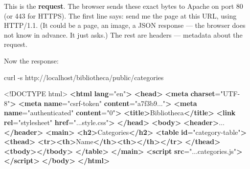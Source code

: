 \documentclass[11pt,a4paper,oneside]{book}
\newenvironment{Shaded}{\begin{snugshade}}{\end{snugshade}}
\newcommand{\KeywordTok}[1]{\textcolor[HTML]{007020}{\textbf{#1}}}
\newcommand{\DataTypeTok}[1]{\textcolor[HTML]{902000}{#1}}
\newcommand{\StringTok}[1]{\textcolor[HTML]{4070A0}{#1}}
\newcommand{\OtherTok}[1]{\textcolor[HTML]{007020}{#1}}
\newcommand{\ExtensionTok}[1]{#1}
\newcommand{\AttributeTok}[1]{\textcolor[HTML]{7D9029}{#1}}
\newcommand{\ErrorTok}[1]{\textcolor[HTML]{FF0000}{\textbf{#1}}}
\newcommand{\NormalTok}[1]{#1}
\begin{document}
This is the \textbf{request}. The browser sends these exact bytes
to Apache on port 80 (or 443 for HTTPS). The first line says:
send me the page at this URL, using HTTP/1.1. (It could be a
page, an image, a JSON response --- the browser does not know in
advance. It just asks.) The rest are headers --- metadata about
the request.

Now the response:

\begin{Shaded}
\begin{Highlighting}[]
\ExtensionTok{curl} \AttributeTok{{-}s}\NormalTok{ http://localhost/bibliotheca/public/categories}
\end{Highlighting}
\end{Shaded}

\begin{Shaded}
\begin{Highlighting}[]
\DataTypeTok{\textless{}!DOCTYPE }\NormalTok{html}\DataTypeTok{\textgreater{}}
\KeywordTok{\textless{}html} \ErrorTok{lang}\OtherTok{=}\StringTok{"en"}\KeywordTok{\textgreater{}}
\KeywordTok{\textless{}head\textgreater{}}
    \KeywordTok{\textless{}meta} \ErrorTok{charset}\OtherTok{=}\StringTok{"UTF{-}8"}\KeywordTok{\textgreater{}}
    \KeywordTok{\textless{}meta} \ErrorTok{name}\OtherTok{=}\StringTok{"csrf{-}token"} \ErrorTok{content}\OtherTok{=}\StringTok{"a7f3b9..."}\KeywordTok{\textgreater{}}
    \KeywordTok{\textless{}meta} \ErrorTok{name}\OtherTok{=}\StringTok{"authenticated"} \ErrorTok{content}\OtherTok{=}\StringTok{"0"}\KeywordTok{\textgreater{}}
    \KeywordTok{\textless{}title\textgreater{}}\NormalTok{Bibliotheca}\KeywordTok{\textless{}/title\textgreater{}}
    \KeywordTok{\textless{}link} \ErrorTok{rel}\OtherTok{=}\StringTok{"stylesheet"} \ErrorTok{href}\OtherTok{=}\StringTok{"...style.css"}\KeywordTok{\textgreater{}}
\KeywordTok{\textless{}/head\textgreater{}}
\KeywordTok{\textless{}body\textgreater{}}
    \KeywordTok{\textless{}header\textgreater{}}\NormalTok{...}\KeywordTok{\textless{}/header\textgreater{}}
    \KeywordTok{\textless{}main\textgreater{}}
        \KeywordTok{\textless{}h2\textgreater{}}\NormalTok{Categories}\KeywordTok{\textless{}/h2\textgreater{}}
        \KeywordTok{\textless{}table} \ErrorTok{id}\OtherTok{=}\StringTok{"category{-}table"}\KeywordTok{\textgreater{}}
            \KeywordTok{\textless{}thead\textgreater{}}
                \KeywordTok{\textless{}tr\textgreater{}\textless{}th\textgreater{}}\NormalTok{Name}\KeywordTok{\textless{}/th\textgreater{}\textless{}th\textgreater{}\textless{}/th\textgreater{}\textless{}/tr\textgreater{}}
            \KeywordTok{\textless{}/thead\textgreater{}}
            \KeywordTok{\textless{}tbody\textgreater{}\textless{}/tbody\textgreater{}}
        \KeywordTok{\textless{}/table\textgreater{}}
    \KeywordTok{\textless{}/main\textgreater{}}
    \KeywordTok{\textless{}script} \ErrorTok{src}\OtherTok{=}\StringTok{"...categories.js"}\KeywordTok{\textgreater{}\textless{}/script\textgreater{}}
\KeywordTok{\textless{}/body\textgreater{}}
\KeywordTok{\textless{}/html\textgreater{}}
\end{Highlighting}
\end{Shaded}
\end{document}
